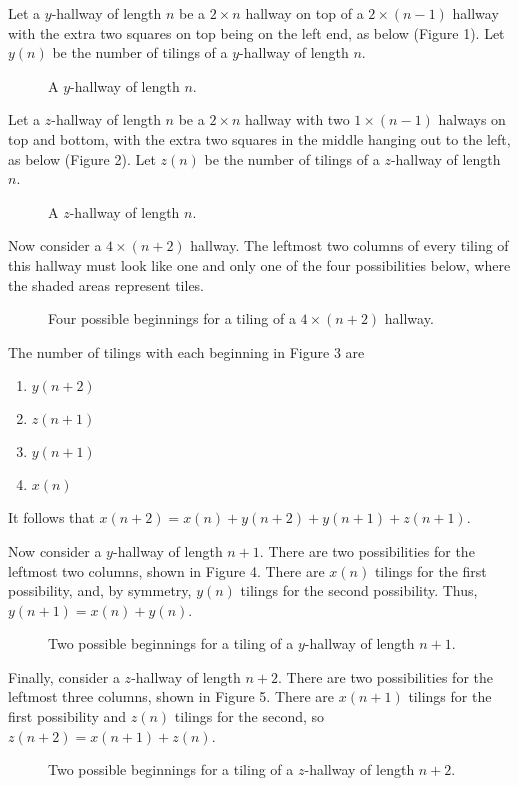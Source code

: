 \documentclass[newpage]{homework}
\begin{document}
	\begin{alphaparts}
		\questionpart
		Let a $y$-hallway of length $n$ be a $2\times n$ hallway on top of a $2\times(n-1)$ hallway with the extra two squares on top being on the left end, as below (Figure 1). Let $y(n)$ be the number of tilings of a $y$-hallway of length $n$.
		\begin{figure}[H]
			\centering
			
			\caption{A $y$-hallway of length $n$.}
		\end{figure}
		Let a $z$-hallway of length $n$ be a $2\times n$ hallway with two $1\times (n-1)$ halways on top and bottom, with the extra two squares in the middle hanging out to the left, as below (Figure 2). Let $z(n)$ be the number of tilings of a $z$-hallway of length $n$.
		\begin{figure}[H]
			\centering
			
			\caption{A $z$-hallway of length $n$.}
		\end{figure}
		Now consider a $4 \times (n+2)$ hallway. The leftmost two columns of every tiling of this hallway must look like one and only one of the four possibilities below, where the shaded areas represent tiles.
		\begin{figure}[H]
			\centering
			
			\caption{Four possible beginnings for a tiling of a $4\times(n+2)$ hallway.}
		\end{figure}
		The number of tilings with each beginning in Figure 3 are
		\begin{enumerate}
			\item $y(n+2)$
			\item $z(n+1)$
			\item $y(n+1)$
			\item $x(n)$
		\end{enumerate}
		It follows that $x(n+2) = x(n) + y(n+2) + y(n+1) + z(n+1)$.
		
		Now consider a $y$-hallway of length $n+1$. There are two possibilities for the leftmost two columns, shown in Figure 4. There are $x(n)$ tilings for the first possibility, and, by symmetry, $y(n)$ tilings for the second possibility. Thus, $y(n+1) = x(n) + y(n)$.
		\begin{figure}[H]
			\begin{center}
				
			\end{center}
			\caption{Two possible beginnings for a tiling of a $y$-hallway of length $n+1$.}
		\end{figure}
		Finally, consider a $z$-hallway of length $n+2$. There are two possibilities for the leftmost three columns, shown in Figure 5. There are $x(n+1)$ tilings for the first possibility and $z(n)$ tilings for the second, so $z(n+2) = x(n+1) + z(n)$.
		\begin{figure}[H]
			\centering
			
			\caption{Two possible beginnings for a tiling of a $z$-hallway of length $n+2$.}
		\end{figure}
	

\end{alphaparts}
\end{document}
